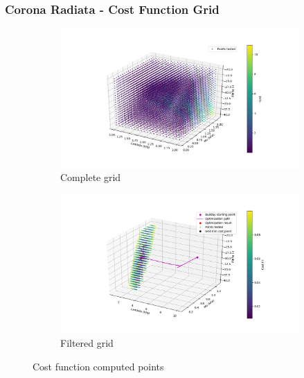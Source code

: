 \documentclass{beamer}
\begin{document}
\begin{frame}
\frametitle{Corona Radiata - Cost Function Grid}
\begin{figure}[h!]
\centering
\begin{subfigure}[t]{0.5\linewidth}
\centering
\includegraphics[width = 1.\linewidth, trim = 80 50 50 50]
{Pictures/CoronaRadiataCompleteGrid}
\caption{Complete grid}
\end{subfigure}%
\begin{subfigure}[t]{0.5\linewidth}
\centering
\includegraphics[width = 1.\textwidth, trim = 50 50 80 50]
{Pictures/CoronaRadiataFilteredGrid}
\caption{Filtered grid}
\end{subfigure}
\caption{Cost function computed points}
\end{figure}
\end{frame}
\end{document}
